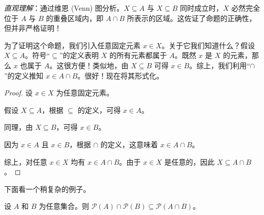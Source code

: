 \emph{直观理解}：通过维恩 (Venn) 图分析。$X \subseteq A$ 与 $X \subseteq B$ 同时成立时，$X$ 必然完全位于 $A$ 与 $B$ 的重叠区域内，即 $A \cap B$ 所表示的区域。这佐证了命题的正确性，但并非严格证明！
\begin{center}
\end{center}

为了证明这个命题，我们引入任意固定元素 $x \in X$。关于它我们知道什么？假设 $X \subseteq A$。符号``$\subseteq$''的定义表明 $X$ 的所有元素都属于 $A$。既然 $x$ 是 $X$ 的元素，那么 $x$ 也属于 $A$。这很方便！类似地，由 $X \subseteq B$ 可得 $x \in B$。综上，我们利用``$\cap$''的定义推知 $x \in A \cap B$。很好！现在将其形式化。

\begin{proof}
    设 $x \in X$ 为任意固定元素。

    假设 $X \subseteq A$，根据 $\subseteq$ 的定义，可得 $x \in A$。

    同理，由 $X \subseteq B$，可得 $x \in B$。

    因为 $x \in A$ 且 $x \in B$，根据 $\cap$ 的定义，这意味着 $x \in A \cap B$。

    综上，对任意 $x \in X$ 均有 $x \in A \cap B$。由于 $x \in X$ 是任意的，因此 $X \subseteq A \cap B$。
\end{proof}

下面看一个稍复杂的例子。

\begin{proposition}
    设 $A$ 和 $B$ 为任意集合。则 $\mathcal{P}(A) \cap \mathcal{P}(B) \subseteq \mathcal{P}(A \cap B)$。
\end{proposition}

